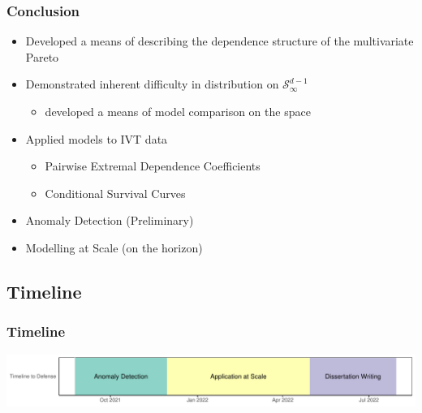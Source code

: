 \documentclass[aspectratio=169]{beamer}
\begin{document}
\begin{frame}
  \frametitle{Conclusion}
  \begin{itemize}
    \item Developed a means of describing the dependence structure of the multivariate Pareto
    \item Demonstrated inherent difficulty in distribution on $\mathcal{S}_{\infty}^{d-1}$
      \begin{itemize}
        \item developed a means of model comparison on the space
      \end{itemize}
    \item Applied models to IVT data
      \begin{itemize}
        \item Pairwise Extremal Dependence Coefficients
        \item Conditional Survival Curves
      \end{itemize}
    \item Anomaly Detection (Preliminary)
    \item Modelling at Scale (on the horizon)
  \end{itemize}
\end{frame}

\subsection{Timeline}

\begin{frame}
    \frametitle{Timeline}
    \begin{center}
        \includegraphics[width=\textwidth]{./images/timeline}
    \end{center}
\end{frame}


\begin{frame}
    
\end{frame}


\appendix
\end{document}
